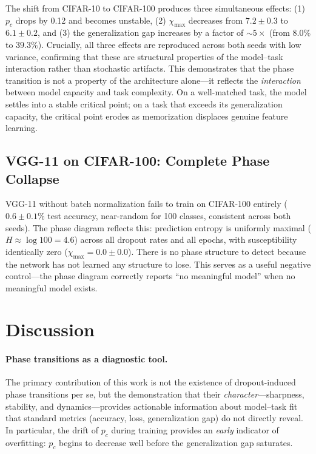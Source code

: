 \documentclass{article}
\begin{document}
The shift from CIFAR-10 to CIFAR-100 produces three simultaneous effects: (1) $p_c$ drops by 0.12 and becomes unstable, (2) $\chi_{\max}$ decreases from $7.2 \pm 0.3$ to $6.1 \pm 0.2$, and (3) the generalization gap increases by a factor of ${\sim}5\times$ (from $8.0\%$ to $39.3\%$). Crucially, all three effects are reproduced across both seeds with low variance, confirming that these are structural properties of the model--task interaction rather than stochastic artifacts. This demonstrates that the phase transition is not a property of the architecture alone---it reflects the \emph{interaction} between model capacity and task complexity. On a well-matched task, the model settles into a stable critical point; on a task that exceeds its generalization capacity, the critical point erodes as memorization displaces genuine feature learning.

\subsection{VGG-11 on CIFAR-100: Complete Phase Collapse}

VGG-11 without batch normalization fails to train on CIFAR-100 entirely ($0.6 \pm 0.1\%$ test accuracy, near-random for 100 classes, consistent across both seeds). The phase diagram reflects this: prediction entropy is uniformly maximal ($H \approx \log 100 = 4.6$) across all dropout rates and all epochs, with susceptibility identically zero ($\chi_{\max} = 0.0 \pm 0.0$). There is no phase structure to detect because the network has not learned any structure to lose. This serves as a useful negative control---the phase diagram correctly reports ``no meaningful model'' when no meaningful model exists.

\section{Discussion}
\label{sec:discussion}

\paragraph{Phase transitions as a diagnostic tool.}
The primary contribution of this work is not the existence of dropout-induced phase transitions per se, but the demonstration that their \emph{character}---sharpness, stability, and dynamics---provides actionable information about model--task fit that standard metrics (accuracy, loss, generalization gap) do not directly reveal. In particular, the drift of $p_c$ during training provides an \emph{early} indicator of overfitting: $p_c$ begins to decrease well before the generalization gap saturates.
\end{document}
